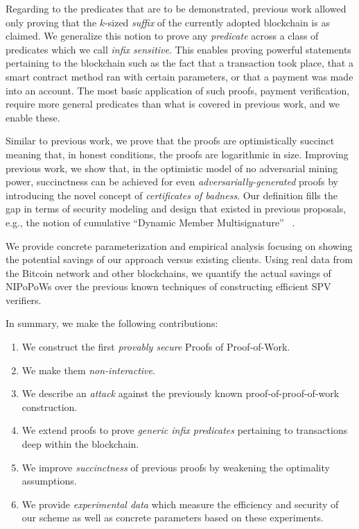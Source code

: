 Regarding to the predicates that are to be demonstrated,
 previous work allowed only proving that the $k$-sized \emph{suffix} of the
currently adopted blockchain is as claimed. We generalize this notion to prove
any \emph{predicate} across a class of predicates which we call \emph{infix
sensitive}. This enables proving powerful statements pertaining to the
blockchain such as the fact that a transaction took place, that a smart contract
method ran with certain parameters, or that a payment was made into an account.
The most basic application of such proofs, payment verification, require more
general predicates than what is covered in previous work, and we enable these.

Similar to previous work, we prove that the proofs are optimistically
succinct meaning that, in honest conditions, the proofs are logarithmic in size.
Improving previous work, we show that, in the optimistic model of no adversarial
mining power, succinctness can be achieved for even
\textit{adversarially-generated} proofs by introducing the novel concept of
\textit{certificates of badness}. Our definition fills the gap in terms of
security modeling and design that existed in previous proposals, e.g., the
notion of cumulative ``Dynamic Member Multisignature'' ~\cite{sidechains}.

We provide concrete parameterization and empirical analysis focusing on showing
the potential savings of our approach versus existing clients. Using real data
from the Bitcoin network and other blockchains, we quantify the actual savings of
NIPoPoWs over the previous known techniques of constructing efficient SPV
verifiers.


In summary, we make the following contributions:
\begin{enumerate}
  \item We construct the first \emph{provably secure} Proofs of Proof-of-Work.
  \item We make them \emph{non-interactive}.
  \item We describe an \emph{attack} against the previously known proof-of-proof-of-work construction.
  \item We extend proofs to prove \emph{generic infix predicates} pertaining to
        transactions deep within the blockchain.
  \item We improve \emph{succinctness} of previous proofs by weakening the
        optimality assumptions.
  \item We provide \emph{experimental data} which measure the efficiency and
        security of our scheme as well as concrete parameters based on these
        experiments.
\end{enumerate}
